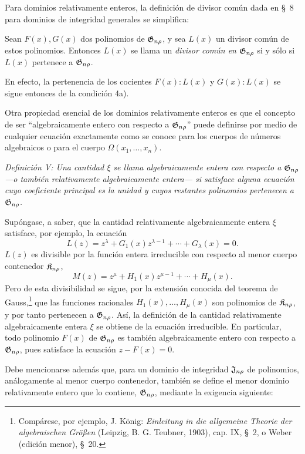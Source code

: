 \documentclass[11pt]{article}
\begin{document}
Para dominios relativamente enteros, la definición de divisor común dada en \S\ 8 para dominios de integridad generales se simplifica:

Sean $F(x),G(x)$ dos polinomios de $\mathfrak{G}_{n\rho}$, y sea $L(x)$ un divisor común de estos polinomios. Entonces $L(x)$ se llama un \emph{divisor común en $\mathfrak{G}_{n\rho}$} si y sólo si $L(x)$ pertenece a $\mathfrak{G}_{n\rho}$.

En efecto, la pertenencia de los cocientes $F(x):L(x)$ y $G(x):L(x)$ se sigue entonces de la condición 4a).

Otra propiedad esencial de los dominios relativamente enteros es que el concepto de ser ``algebraicamente entero con respecto a $\mathfrak{G}_{n\rho}$'' puede definirse por medio de cualquier ecuación exactamente como se conoce para los cuerpos de números algebraicos o para el cuerpo $\Omega(x_1,\ldots,x_n)$.

\emph{Definición V: Una cantidad $\xi$ se llama algebraicamente entera con respecto a $\mathfrak{G}_{n\rho}$ ---o también relativamente algebraicamente entera--- si satisface alguna ecuación cuyo coeficiente principal es la unidad y cuyos restantes polinomios pertenecen a $\mathfrak{G}_{n\rho}$.}

Supóngase, a saber, que la cantidad relativamente algebraicamente entera $\xi$ satisface, por ejemplo, la ecuación
\[
  L(z)=z^\lambda+G_1(x)z^{\lambda-1}+\cdots+G_\lambda(x)=0.
\]
$L(z)$ es divisible por la función entera irreducible con respecto al menor cuerpo contenedor $\mathfrak{K}_{n\rho}$,
\[
  M(z)=z^\mu+H_1(x)z^{\mu-1}+\cdots+H_\mu(x).
\]
Pero de esta divisibilidad se sigue, por la extensión conocida del teorema de Gauss,\footnote{Compárese, por ejemplo, J. König: \emph{Einleitung in die allgemeine Theorie der algebraischen Größen} (Leipzig, B. G. Teubner, 1903), cap. IX, \S\ 2, o Weber (edición menor), \S\ 20.} que las funciones racionales $H_1(x),\ldots,H_\mu(x)$ son polinomios de $\mathfrak{K}_{n\rho}$, y por tanto pertenecen a $\mathfrak{G}_{n\rho}$. Así, la definición de la cantidad relativamente algebraicamente entera $\xi$ se obtiene de la ecuación irreducible. En particular, todo polinomio $F(x)$ de $\mathfrak{G}_{n\rho}$ es también algebraicamente entero con respecto a $\mathfrak{G}_{n\rho}$, pues satisface la ecuación $z-F(x)=0$.

Debe mencionarse además que, para un dominio de integridad $\mathfrak{J}_{n\rho}$ de polinomios, análogamente al menor cuerpo contenedor, también se define el menor dominio relativamente entero que lo contiene, $\mathfrak{G}_{n\rho}$, mediante la exigencia siguiente:
\end{document}
